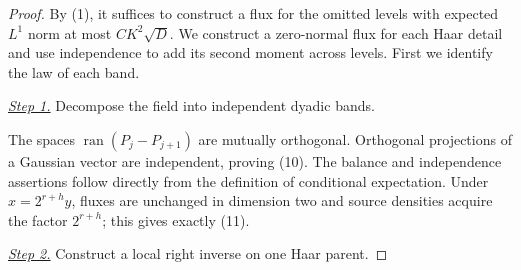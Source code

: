 \documentclass{aomart}
\theoremstyle{definition}
\newcommand{\1}{\mathbf 1}
\begin{document}
\begin{proof}
By (1), it suffices to construct a flux for the omitted levels with
expected $L^1$ norm at most $CK^2\sqrt D$.  We construct a zero-normal
flux for each Haar detail and use independence to add its second moment
across levels.  First we identify the law of each band.

\smallskip\noindent
\underline{\textit{Step 1.}} Decompose the field into independent dyadic bands.

The spaces $\operatorname {ran}(P_ j-P_ {j+1})$ are mutually orthogonal.
Orthogonal projections of a Gaussian vector are independent, proving
(10). The balance and independence assertions follow directly from the
definition of conditional expectation. Under $x=2^{r+h}y$, fluxes are
unchanged in dimension two and source densities acquire the factor
$2^{r+h}$; this gives exactly (11).

\smallskip\noindent
\underline{\textit{Step 2.}} Construct a local right inverse on one Haar parent.


\end{proof}
\end{document}

